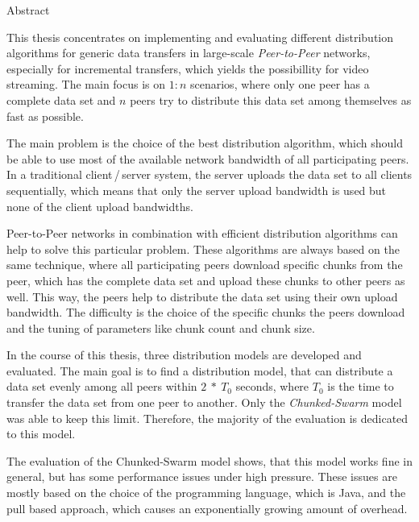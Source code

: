 
\begin{center} 
\huge Abstract
\end{center}


This thesis concentrates on implementing and evaluating different distribution algorithms for generic data transfers in large-scale \emph{Peer-to-Peer} networks, especially for incremental transfers, which yields the possibillity for video streaming. The main focus is on $1:n$ scenarios, where only one peer has a complete data set and $n$ peers try to distribute this data set among themselves as fast as possible.

The main problem is the choice of the best distribution algorithm, which should be able to use most of the available network bandwidth of all participating peers. In a traditional client\,/\,server system, the server uploads the data set to all clients sequentially, which means that only the server upload bandwidth is used but none of the client upload bandwidths.

Peer-to-Peer networks in combination with efficient distribution algorithms can help to solve this particular problem. These algorithms are always based on the same technique, where all participating peers download specific chunks from the peer, which has the complete data set and upload these chunks to other peers as well. This way, the peers help to distribute the data set using their own upload bandwidth. The difficulty is the choice of the specific chunks the peers download and the tuning of parameters like chunk count and chunk size.

In the course of this thesis, three distribution models are developed and evaluated. The main goal is to find a distribution model, that can distribute a data set evenly among all peers within $2\:*\:T_0$ seconds, where $T_0$ is the time to transfer the data set from one peer to another. Only the \emph{Chunked-Swarm} model was able to keep this limit. Therefore, the majority of the evaluation is dedicated to this model.

The evaluation of the Chunked-Swarm model shows, that this model works fine in general, but has some performance issues under high pressure. These issues are mostly based on the choice of the programming language, which is Java, and the pull based approach, which causes an exponentially growing amount of overhead. 